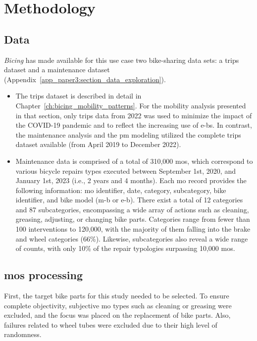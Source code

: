 \section{Methodology}
\label{sec:failure_forecasting_methodology}

    \subsection{Data}

\textit{Bicing} has made available for this use case two bike-sharing data sets: a trips dataset and a maintenance dataset (Appendix~\ref{app_paper3:section_data_exploration}).

\begin{itemize}
    \item The trips dataset is described in detail in Chapter~\ref{ch:bicing_mobility_patterns}. For the mobility analysis presented in that section, only trips data from 2022 was used to minimize the impact of the COVID-19 pandemic and to reflect the increasing use of \acp{e-b}. In contrast, the maintenance analysis and the \ac{pm} modeling utilized the complete trips dataset available (from April 2019 to December 2022).

    \item Maintenance data is comprised of a total of 310,000 \acp{mo}, which correspond to various bicycle repairs types executed between September 1st, 2020, and January 1st, 2023 (i.e., 2 years and 4 months). Each \ac{mo} record provides the following information: \ac{mo} identifier, date, category, subcategory, bike identifier, and bike model (\ac{m-b} or \ac{e-b}).
    There exist a total of 12 categories and 87 subcategories, encompassing a wide array of actions such as cleaning, greasing, adjusting, or changing bike parts. Categories range from fewer than 100 interventions to 120,000, with the majority of them falling into the brake and wheel categories (66\%). Likewise, subcategories also reveal a wide range of counts, with only 10\% of the repair typologies surpassing 10,000 \acp{mo}.
  \end{itemize}

    \subsection[MOs processing]{\acp{mo} processing} 
    \label{section_mos_processing}

First, the target bike parts for this study needed to be selected. To ensure complete objectivity, subjective \ac{mo} types such as cleaning or greasing were excluded, and the focus was placed on the replacement of bike parts. Also, failures related to wheel tubes were excluded due to their high level of randomness.

